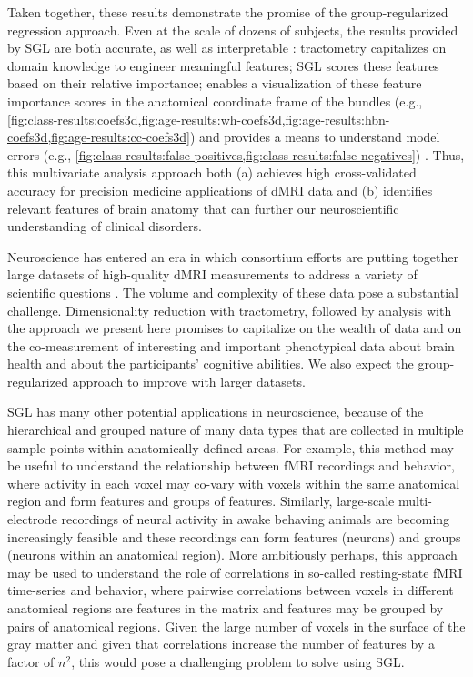 Taken together, these results demonstrate the promise of the
group-regularized regression approach. Even at the scale of dozens of
subjects, the results provided by SGL are both accurate, as well as
interpretable \cite{Murdoch2019-ax}: tractometry capitalizes on domain
knowledge to engineer meaningful features; SGL scores these features based on
their relative importance; enables a visualization of these feature
importance scores in the anatomical coordinate frame of the bundles (e.g.,
\cref{fig:class-results:coefs3d,fig:age-results:wh-coefs3d,fig:age-results:hbn-coefs3d,fig:age-results:cc-coefs3d})
and provides a means to understand model errors (e.g.,
\cref{fig:class-results:false-positives,fig:class-results:false-negatives}) .
Thus, this multivariate analysis approach both (a) achieves high
cross-validated accuracy for precision medicine applications of dMRI data and
(b) identifies relevant features of brain anatomy that can further our
neuroscientific understanding of clinical disorders.

Neuroscience has entered an era in which consortium efforts are putting together
large datasets of high-quality dMRI measurements to address a variety of
scientific questions \cite{jernigan2016ping, jernigan2018abcd,
alexander2017open, Miller2016-hw, VanEssen2012}. The volume and complexity of
these data pose a substantial challenge. Dimensionality reduction with
tractometry, followed by analysis with the approach we present here promises to
capitalize on the wealth of data and on the co-measurement of interesting and
important phenotypical data about brain health and about the participants'
cognitive abilities. We also expect the group-regularized approach to improve
with larger datasets.

SGL has many other potential applications in neuroscience, because
of the hierarchical and grouped nature of many data types that are
collected in multiple sample points within anatomically-defined areas.
For example, this method may be useful to understand the relationship
between fMRI recordings and behavior, where activity in each voxel
may co-vary with voxels within the same anatomical region and form
features and groups of features. Similarly, large-scale multi-electrode
recordings of neural activity in awake behaving animals are becoming
increasingly feasible \cite{steinmetz2018distributed, Jun2017-gv} and
these recordings can form features (neurons) and groups (neurons within
an anatomical region). More ambitiously perhaps, this approach may be
used to understand the role of correlations in so-called resting-state
fMRI time-series and behavior, where pairwise correlations between
voxels in different anatomical regions are features in the matrix and
features may be grouped by pairs of anatomical regions. Given the large
number of voxels in the surface of the gray matter and given that
correlations increase the number of features by a factor of $n^2$, this
would pose a challenging problem to solve using SGL.

